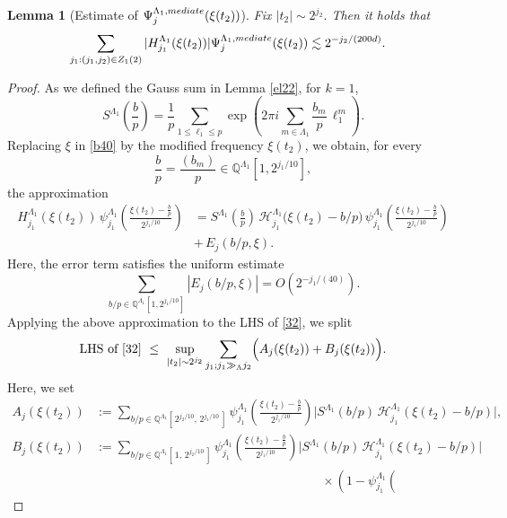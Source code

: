 \documentclass[10pt,a4paper]{amsart}
\newtheorem{lemma}{Lemma}\numberwithin{lemma}{section}
\numberwithin{equation}{section}
\begin{document}
\begin{lemma}[Estimate of $\Psi^{\Lambda_1,\rm{mediate}}_{j}(\xi(t_2))$]\label{prop41}
 Fix $|t_2|\sim 2^{j_2}.$ Then it holds that
\begin{align}\label{32}
&\sum_{j_1:(j_1,j_2)\in Z_1(2)}|H^{\Lambda_1}_{j_1}(\xi(t_2))|\Psi^{\Lambda_1,\rm{mediate}}_{j}(\xi(t_2)) \lesssim 2^{-j_2/(200d)}.
\end{align}
\end{lemma}
 
 
\begin{proof}
As we defined the Gauss sum in Lemma \ref{el22}, for $k=1$,  
\[
S^{\Lambda_1}\!\left(\frac{b}{p}\right)
   = \frac{1}{p}\sum_{1\le \ell_1\le p}
      \exp\!\left(2\pi i \sum_{m\in\Lambda_1}
      \frac{b_m}{p}\,\ell_1^m\right).
\]
Replacing $\xi$ in \eqref{b40} by the modified frequency $\xi(t_2)$, we obtain, for every 
\[
\frac{b}{p}=\frac{(b_m)}{p} \in \mathbb{Q}^{\Lambda_1}[1,2^{j_1/10}],
\]
the approximation
\[
\begin{aligned}
H_{j_1}^{\Lambda_1}(\xi(t_2))\,
\psi^{\Lambda_1}_{j_1}\!\left(\frac{\xi(t_2)-\frac{b}{p}}{2^{j_1/10}}\right)
&= 
S^{\Lambda_1}\!\left(\frac{b}{p}\right)\,
\mathcal{H}^{\Lambda_1}_{j_1}\!\bigl(\xi(t_2)-b/p\bigr)\,
\psi^{\Lambda_1}_{j_1}\!\left(\frac{\xi(t_2)-\frac{b}{p}}{2^{j_1/10}}\right)  \\
& 
+\, E_{j}(b/p,\xi).
\end{aligned}
\]
Here, the error term satisfies the uniform estimate
\[
\sum_{b/p\in \mathbb{Q}^{\Lambda_1}[1,2^{j_1/10}]}
   |E_j(b/p,\xi)|
   = O(2^{- j_1/(40)}).
\]
Applying the above approximation to the LHS of \eqref{32},  
we split
\[
\text{LHS of \eqref{32}}
   \ \le\ 
   \sup_{|t_2|\sim 2^{j_2}}
   \sum_{\substack{j_1; j_1\gg_{\Lambda} j_2}}
   \Bigl(
      A_j(\xi(t_2)) + B_j(\xi(t_2))
   \Bigr).
\]
Here, we   set
\[
\begin{aligned}
A_j(\xi(t_2))
&:=
\sum_{b/p\in \mathbb{Q}^{\Lambda_1}[\,2^{j_2/10},\,2^{j_1/10}\,]}
\psi^{\Lambda_1}_{j_1}\!\left(
   \frac{\xi(t_2)-\frac{b}{p}}{2^{j_1/10}}
\right)
\bigl|
   S^{\Lambda_1}(b/p)\,
   \mathcal{H}^{\Lambda_1}_{j_1}(\xi(t_2)-b/p)
\bigr|,
\\[1em]
B_j(\xi(t_2))
&:=
\sum_{b/p\in \mathbb{Q}^{\Lambda_1}[\,1,\,2^{j_2/10}\,]}
\psi^{\Lambda_1}_{j_1}\!\left(
   \frac{\xi(t_2)-\frac{b}{p}}{2^{j_1/10}}
\right)
\bigl|
   S^{\Lambda_1}(b/p)\,
   \mathcal{H}^{\Lambda_1}_{j_1}(\xi(t_2)-b/p)
\bigr|
\\
&\qquad\qquad \qquad\qquad\qquad\qquad\qquad\qquad\qquad\times
\left(
   1-
   \psi^{\Lambda_1}_{j_1}\!\left(

\end{aligned}\]
\end{proof}
\end{document}
